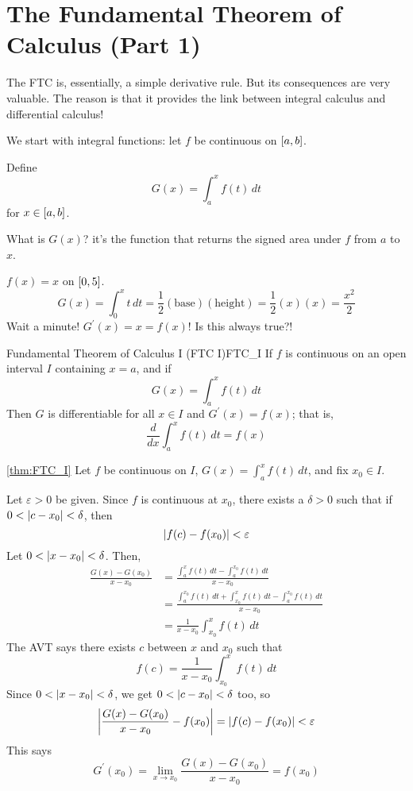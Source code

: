 \section{The Fundamental Theorem of Calculus (Part 1)}
The FTC is, essentially, a simple derivative rule. But
its consequences are very valuable. The reason is that it
provides the link between integral calculus and
differential calculus!

We start with integral functions: let $ f $ be
continuous on $ \interval{a}{b} $.

Define
\[ G(x)=\int_{a}^{x} f(t)\, d{t}  \]
for $ x\in\interval{a}{b} $.

What is $ G(x) $? it's the function that returns the signed
area under $ f $ from $ a $ to $ x $.

\begin{Example}{}{}
    $ f(x)=x $ on $ \interval{0}{5} $.
    \[
        G(x)
        =\int_{0}^{x} t\, d{t}
        =\frac{1}{2}(\text{base})(\text{height})
        =\frac{1}{2}(x)(x)
        =\frac{x^2}{2}
    \]
    Wait a minute! $ G^\prime(x)=x=f(x) $! Is this always true?!
\end{Example}

\begin{Theorem}{Fundamental Theorem of Calculus I (FTC I)}{FTC_I}
    If $ f $ is continuous on an open interval $ I $ containing
    $ x=a $, and if
    \[ G(x)=\int_{a}^{x} f(t)\, d{t}  \]
    Then $ G $ is differentiable for all $ x\in I $ and
    $ G^\prime(x)=f(x) $; that is,
    \[ \frac{d}{dx}\int_{a}^{x} f(t)\, d{t}=f(x) \]
\end{Theorem}

\begin{Proof}{\ref{thm:FTC_I}}{}
    Let $ f $ be continuous on $ I $, $ G(x)=\int_{a}^{x} f(t)\, d{t} $,
    and fix $ x_0\in I $.

    Let $ \varepsilon>0 $ be given. Since $ f $ is continuous at $ x_0 $,
    there exists a $ \delta>0 $ such that if $ 0<\abs{c-x_0}<\delta $, then
    \[ \abs{f(c)-f(x_0)}<\varepsilon \]
    Let $ 0<\abs{x-x_0}<\delta $. Then,
    \begin{align*}
        \frac{G(x)-G(x_0)}{x-x_0}
         & =\frac{\int_{a}^{x} f(t)\, d{t} -\int_{a}^{x_0} f(t)\, d{t} }
        {x-x_0}                                                           \\
         & =\frac{\int_{a}^{x_0} f(t)\, d{t} +\int_{x_0}^{x} f(t)\, d{t}-
        \int_{a}^{x_0} f(t)\, d{t} }{x-x_0}                               \\
         & =\frac{1}{x-x_0} \int_{x_0}^{x} f(t)\, d{t}
    \end{align*}
    The AVT says there exists $ c $ between $ x $ and $ x_0 $ such that
    \[ f(c)=\frac{1}{x-x_0} \int_{x_0}^{x} f(t)\, d{t}  \]
    Since $ 0<\abs{x-x_0}<\delta $, we get $ 0<\abs{c-x_0}<\delta $ too,
    so
    \[
        \abs*{\frac{G(x)-G(x_0)}{x-x_0}-f(x_0)}=\abs{f(c)-f(x_0)}<\varepsilon
    \]
    This says
    \[ G^\prime(x_0)=\lim\limits_{{x} \to {x_0}} \frac{G(x)-G(x_0)}{x-x_0}=f(x_0) \]
\end{Proof}

